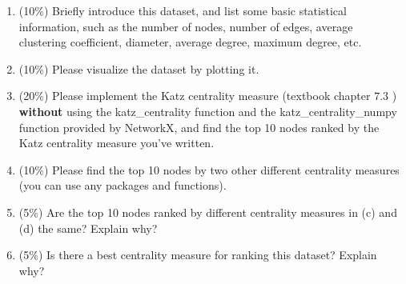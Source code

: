 \documentclass[12pt]{article}
\begin{document}
\begin{enumerate}[label=(\alph*)]
	\item (10\%) Briefly introduce this dataset, and list some basic statistical information, such as the number of nodes, number of edges, average clustering coefficient, diameter, average degree, maximum degree, etc.
	\item (10\%) Please visualize the dataset by plotting it. 
	\item (20\%) Please implement the Katz centrality measure (textbook chapter $7.3$ \cite{newman2010networks}) {\bf without} using the katz\_centrality function and the katz\_centrality\_numpy function provided by NetworkX, and find the top 10 nodes ranked by the Katz centrality measure you've written.
	\item (10\%) Please find the top 10 nodes by two other different centrality measures (you can use any packages and functions).
	\item (5\%) Are the top 10 nodes ranked by different centrality measures in (c) and (d) the same? Explain why?
	\item (5\%) Is there a best centrality measure for ranking this dataset? Explain why?
\end{enumerate}
\end{document}
